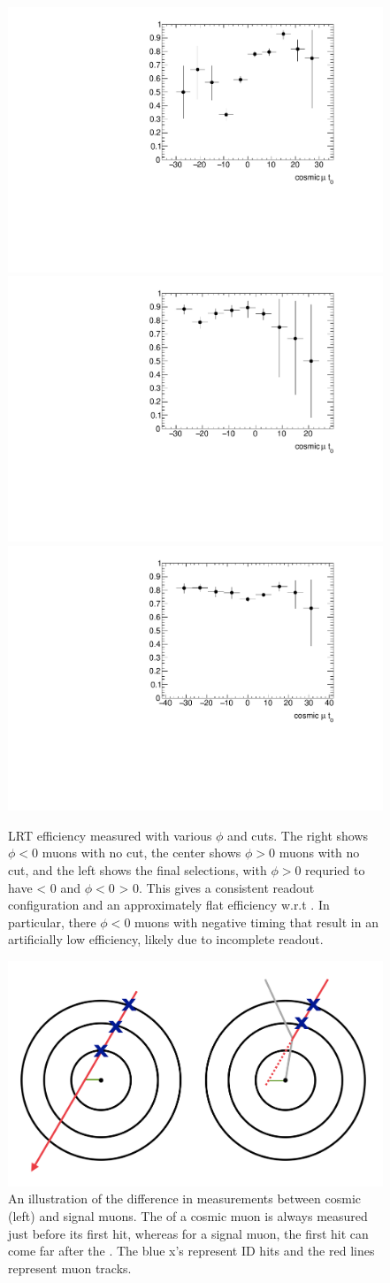 \begin{figure}[htbp]
\centering
\includegraphics[width=.3\textwidth]{figures/LRT_systs/cosmics_phil0_eff_t0.pdf}
\includegraphics[width=.3\textwidth]{figures/LRT_systs/cosmics_phig0_eff_t0.pdf}
\includegraphics[width=.3\textwidth]{figures/LRT_systs/cosmics_eff_t0.pdf}
\caption{\ac{LRT} efficiency measured with various $\phi$ and \tavg cuts. The right shows $\phi < 0$ muons with no \tavg cut, the center shows $\phi > 0$ muons with no \tavg cut, and the left shows the final selections, with $\phi > 0$ requried to have \tavg < 0 and $\phi < 0$ \tavg > 0. This gives a consistent readout configuration and an approximately flat efficiency w.r.t \tavg. In particular, there $\phi < 0$ muons with negative timing that result in an artificially low efficiency, likely due to incomplete readout.}
\label{fig:cos_sys_t0}
\end{figure}


\begin{figure}[htbp]
\centering
\includegraphics[width=.6\textwidth]{figures/LRT_systs/cos_sig_LRT.png}
\caption{An illustration of the difference in \dz measurements between cosmic (left) and signal muons. The \dz of a cosmic muon is always measured just before its first hit, whereas for a signal muon, the first hit can come far after the \dz. The blue x's represent \ac{ID} hits and the red lines represent muon tracks.}
\label{fig:lrt_sig_sketch}
\end{figure}



